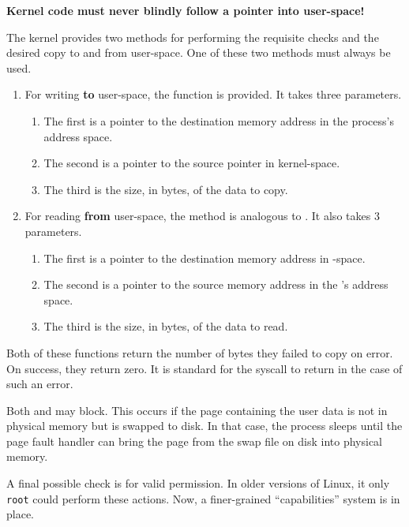 \begin{center}
  \Large{\textbf{Kernel code must never blindly follow a pointer into user-space!}}
\end{center}

The kernel provides two methods for performing the requisite checks and the desired copy to and from user-space.
One of these two methods must always be used.
\begin{enumerate}[noitemsep]
\item For writing \textbf{to} user-space, the function  is provided.
  It takes three parameters.
  \begin{enumerate}[noitemsep]
  \item The first is a pointer to the destination memory address in the process’s address space.
  \item The second is a pointer to the source pointer in kernel-space.
  \item The third is the size, in bytes, of the data to copy.
\end{enumerate}

\item For reading \textbf{from} user-space, the method  is analogous to .
  It also takes 3 parameters.
  \begin{enumerate}[noitemsep]
  \item The first is a pointer to the destination memory address in -space.
  \item The second is a pointer to the source memory address in the 's address space.
  \item The third is the size, in bytes, of the data to read.
\end{enumerate}

\end{enumerate}

Both of these functions return the number of bytes they failed to copy on error.
On success, they return zero.
It is standard for the syscall to return  in the case of such an error.

Both  and  may block.
This occurs if the page containing the user data is not in physical memory but is swapped to disk.
In that case, the process sleeps until the page fault handler can bring the page from the swap file on disk into physical memory.

A final possible check is for valid permission.
In older versions of Linux, it only \texttt{root} could perform these actions.
Now, a finer-grained ``capabilities'' system is in place.

